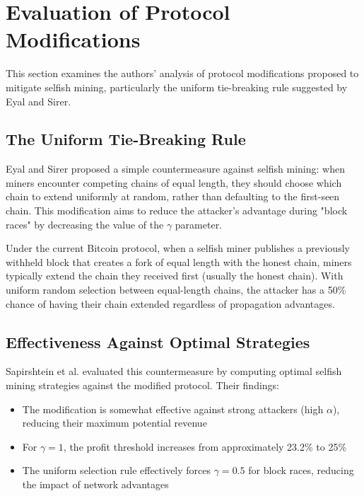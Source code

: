 \documentclass[conference]{IEEEtran}
\begin{document}
\section{Evaluation of Protocol Modifications}

This section examines the authors' analysis of protocol modifications proposed to mitigate selfish mining, particularly the uniform tie-breaking rule suggested by Eyal and Sirer.

\subsection{The Uniform Tie-Breaking Rule}

Eyal and Sirer proposed a simple countermeasure against selfish mining: when miners encounter competing chains of equal length, they should choose which chain to extend uniformly at random, rather than defaulting to the first-seen chain. This modification aims to reduce the attacker's advantage during "block races" by decreasing the value of the $\gamma$ parameter.

Under the current Bitcoin protocol, when a selfish miner publishes a previously withheld block that creates a fork of equal length with the honest chain, miners typically extend the chain they received first (usually the honest chain). With uniform random selection between equal-length chains, the attacker has a 50\% chance of having their chain extended regardless of propagation advantages.

\subsection{Effectiveness Against Optimal Strategies}

Sapirshtein et al. evaluated this countermeasure by computing optimal selfish mining strategies against the modified protocol. Their findings:

\begin{itemize}
    \item The modification is somewhat effective against strong attackers (high $\alpha$), reducing their maximum potential revenue
    \item For $\gamma = 1$, the profit threshold increases from approximately 23.2\% to 25\% 
    \item The uniform selection rule effectively forces $\gamma = 0.5$ for block races, reducing the impact of network advantages
\end{itemize}
\end{document}
